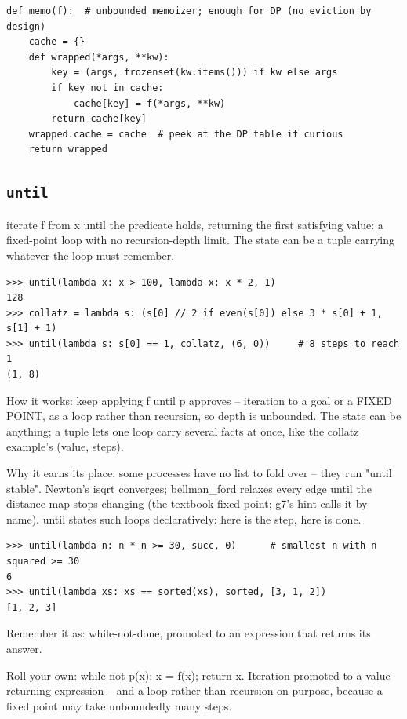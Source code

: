 \documentclass[10pt,letterpaper]{book}
\begin{document}
\begin{lstlisting}[style=ex]
def memo(f):  # unbounded memoizer; enough for DP (no eviction by design)
    cache = {}
    def wrapped(*args, **kw):
        key = (args, frozenset(kw.items())) if kw else args
        if key not in cache:
            cache[key] = f(*args, **kw)
        return cache[key]
    wrapped.cache = cache  # peek at the DP table if curious
    return wrapped
\end{lstlisting}
\subsection{\texttt{until}}\label{def:until}
iterate f from x until the predicate holds, returning the first satisfying value: a fixed-point loop with no recursion-depth limit. The state can be a tuple carrying whatever the loop must remember.
\begin{lstlisting}[style=ex]
>>> until(lambda x: x > 100, lambda x: x * 2, 1)
128
>>> collatz = lambda s: (s[0] // 2 if even(s[0]) else 3 * s[0] + 1, s[1] + 1)
>>> until(lambda s: s[0] == 1, collatz, (6, 0))     # 8 steps to reach 1
(1, 8)
\end{lstlisting}

How it works: keep applying f until p approves -- iteration to a goal or a FIXED POINT, as a loop rather than recursion, so depth is unbounded. The state can be anything; a tuple lets one loop carry several facts at once, like the collatz example's (value, steps).


Why it earns its place: some processes have no list to fold over -- they run "until stable". Newton's isqrt converges; bellman\_ford relaxes every edge until the distance map stops changing (the textbook fixed point; g7's hint calls it by name). until states such loops declaratively: here is the step, here is done.

\begin{lstlisting}[style=ex]
>>> until(lambda n: n * n >= 30, succ, 0)      # smallest n with n squared >= 30
6
>>> until(lambda xs: xs == sorted(xs), sorted, [3, 1, 2])
[1, 2, 3]
\end{lstlisting}

Remember it as: while-not-done, promoted to an expression that returns its answer.


Roll your own: while not p(x): x = f(x); return x. Iteration promoted to a value-returning expression -- and a loop rather than recursion on purpose, because a fixed point may take unboundedly many steps.
\end{document}
